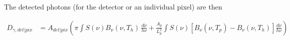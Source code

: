 \documentclass[11pt]{article}
\begin{document}
The detected photons (for the detector or an individual pixel) are then

\begin{align}
    D_{\gamma,det|pix} &= A_{det|pix} \left( \pi \int S(\nu) B_{\nu}(\nu, T_{h}) \, \frac{d\nu}{h\nu} + \frac{A_p}{L_p^2} \int S(\nu) \left[ B_{\nu}(\nu, T_{p}) - B_{\nu}(\nu, T_{h}) \right] \frac{d\nu}{h\nu} \right) \\
\end{align}
\end{document}

